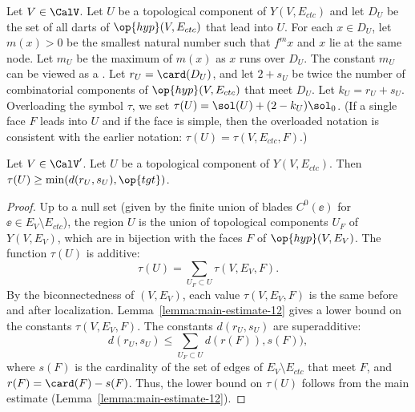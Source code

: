 \begin{definition}[$D_U$,~$m_U$,~$r_U$,~$s_U$,~$k_U$,~$\tau(U)$]
  Let $V\in \CalV$.  Let $U$ be a topological component of
  $Y(V,E_{ctc})$ and let $D_U$ be the set of all darts of $\op{hyp}(V,E_{ctc})$
 that lead into
  $U$.   For each
  $x\in D_U$, let $m(x) >0$ be the smallest natural number such that
  $f^{m} x$ and $x$ lie at the same node.  Let $m_U$ be the maximum of
  $m(x)$  as $x$ runs over $D_U$.  The constant $m_U$ can be viewed as
  a .  
Let $r_U = \card(D_U)$, and let $2+s_U$ be twice the
  number of combinatorial components of $\op{hyp}(V,E_{ctc})$ that
  meet $D_U$.  Let $k_U=r_U+s_U$.  Overloading the symbol $\tau$, we
  set $\tau(U) = \sol(U) +  (2-k_U)\sol_0$.   (If a single  face $F$ leads into
  $U$ and if the face is simple, then the overloaded notation is consistent
with the earlier notation: $\tau(U) = \tau(V,E_{ctc},F)$.)
%
\end{definition}

\begin{lemma}\label{lemma:tauU'}
  Let $V\in \CalV'$.
Let $U$ be a topological component of
  $Y(V,E_{ctc})$.   Then $\tau(U)\ge \min(d(r_U,s_U),\op{tgt})$.
\end{lemma}

\begin{proof}
Up to a null set (given by the finite union of blades $C^0(\ee)$ for
$\ee\in E_V\setminus E_{ctc}$), the region $U$ is the union of topological
components $U_F$ of $Y(V,E_V)$, which are in bijection with the faces
$F$ of $\op{hyp}(V,E_V)$.  The function $\tau(U)$ is additive:
\begin{equation}\label{eqn:tau-additive}
\tau(U) = \sum_{U_F\subset U} \tau(V,E_V,F).
\end{equation}
By the biconnectedness of $(V,E_V)$, each value $\tau(V,E_V,F)$ is the
same before and after localization.
Lemma~\ref{lemma:main-estimate-12} gives a lower bound on the
constants $\tau(V,E_V,F)$.  The constants $d(r_U,s_U)$ are superadditive:
\[
d(r_U,s_U) \le \sum_{U_F\subset U} d(r(F)),s(F)),
\]
where $s(F)$ is the cardinality of the set of edges of $E_V\setminus
E_{ctc}$ that meet $F$, and $r(F) = \card(F)-s(F)$.  Thus, the 
lower bound on $\tau(U)$ follows from the main estimate
(Lemma~\ref{lemma:main-estimate-12}).
\end{proof}

